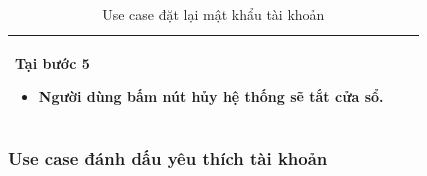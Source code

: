 \documentclass[12pt,a4paper]{article}
\begin{document}
\begin{table}[H]
\begin{tabular}{|p{3.5cm}|p{11.5cm}|c|}
            Tại bước 5\newline
            \vspace{-.8cm}\begin{itemize}
                              \item Người dùng bấm nút hủy hệ thống sẽ tắt cửa sổ.
            \end{itemize} \\
            \hline
        \end{tabular}
        \caption{Use case đặt lại mật khẩu tài khoản}
    \end{table}

    \subsubsection*{Use case đánh dấu yêu thích tài khoản}
\end{document}
